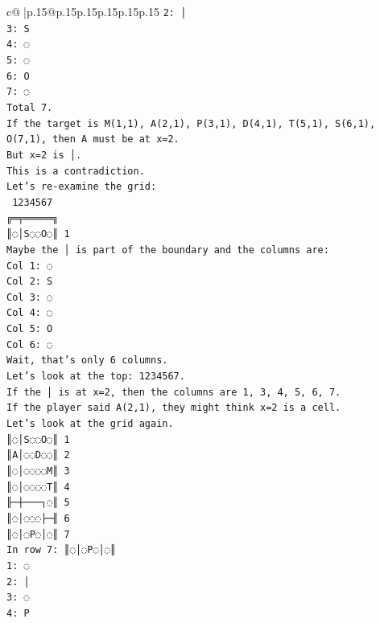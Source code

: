 \documentclass{article}
\begin{document}
{\begin{supertabular}{c@{$\;$}|p{.15\linewidth}@{}p{.15\linewidth}p{.15\linewidth}p{.15\linewidth}p{.15\linewidth}p{.15\linewidth}}
{{{\texttt{2: │} \\
\texttt{3: S} \\
\texttt{4: ◌} \\
\texttt{5: ◌} \\
\texttt{6: O} \\
\texttt{7: ◌} \\
\texttt{Total 7.} \\
\texttt{If the target is M(1,1), A(2,1), P(3,1), D(4,1), T(5,1), S(6,1), O(7,1), then A must be at x=2.} \\
\texttt{But x=2 is │.} \\
\texttt{This is a contradiction.} \\
\texttt{Let's re{-}examine the grid:} \\
\texttt{ 1234567} \\
\texttt{╔═╤═════╗} \\
\texttt{║◌│S◌◌O◌║ 1} \\
\texttt{Maybe the │ is part of the boundary and the columns are:} \\
\texttt{Col 1: ◌} \\
\texttt{Col 2: S} \\
\texttt{Col 3: ◌} \\
\texttt{Col 4: ◌} \\
\texttt{Col 5: O} \\
\texttt{Col 6: ◌} \\
\texttt{Wait, that's only 6 columns.} \\
\texttt{Let's look at the top: 1234567.} \\
\texttt{If the │ is at x=2, then the columns are 1, 3, 4, 5, 6, 7.} \\
\texttt{If the player said A(2,1), they might think x=2 is a cell.} \\
\texttt{Let's look at the grid again.} \\
\texttt{║◌│S◌◌O◌║ 1} \\
\texttt{║A│◌◌D◌◌║ 2} \\
\texttt{║◌│◌◌◌◌M║ 3} \\
\texttt{║◌│◌◌◌◌T║ 4} \\
\texttt{╟─┼───┐◌║ 5} \\
\texttt{║◌│◌◌◌├─╢ 6} \\
\texttt{║◌│◌P◌│◌║ 7} \\
\texttt{In row 7: ║◌│◌P◌│◌║} \\
\texttt{1: ◌} \\
\texttt{2: │} \\
\texttt{3: ◌} \\
\texttt{4: P} \\
}}}
\end{supertabular}}
\end{document}
